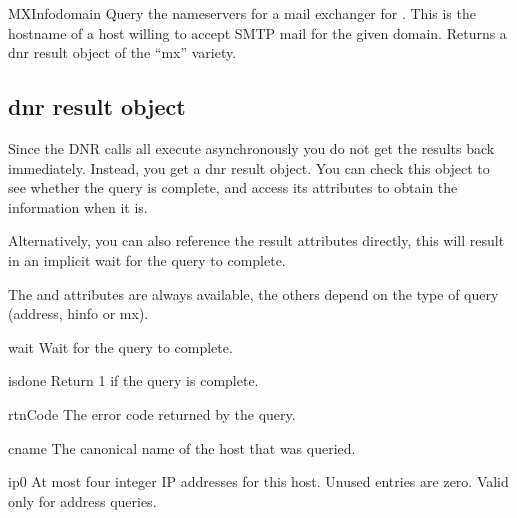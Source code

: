 \begin{funcdesc}{MXInfo}{domain}
Query the nameservers for a mail exchanger for .  This is
the hostname of a host willing to accept SMTP mail for the given
domain.  Returns a dnr result object of the ``mx'' variety.
\end{funcdesc}

\subsection{dnr result object}

Since the DNR calls all execute asynchronously you do not get the
results back immediately.  Instead, you get a dnr result object.  You
can check this object to see whether the query is complete, and access
its attributes to obtain the information when it is.

Alternatively, you can also reference the result attributes directly,
this will result in an implicit wait for the query to complete.

The  and  attributes are always available, the
others depend on the type of query (address, hinfo or mx).

\renewcommand{\indexsubitem}{(dnr result object method)}

\begin{funcdesc}{wait}{}
Wait for the query to complete.
\end{funcdesc}

\begin{funcdesc}{isdone}{}
Return 1 if the query is complete.
\end{funcdesc}

\renewcommand{\indexsubitem}{(dnr result object attribute)}

\begin{datadesc}{rtnCode}
The error code returned by the query.
\end{datadesc}

\begin{datadesc}{cname}
The canonical name of the host that was queried.
\end{datadesc}

\begin{datadesc}{ip0}
At most four integer IP addresses for this host.  Unused entries are
zero.  Valid only for address queries.
\end{datadesc}

